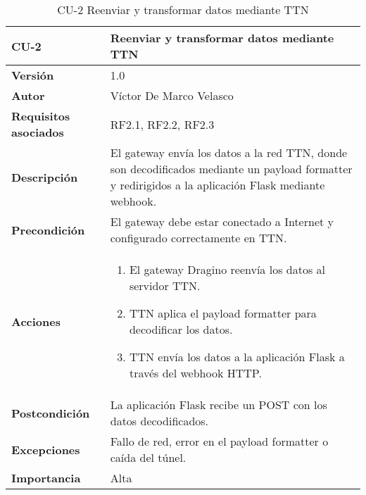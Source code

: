 \begin{table}[p]
	\centering
	\begin{tabularx}{\linewidth}{ p{} p{} }
		\toprule
		\textbf{CU-2}    & Reenviar y transformar datos mediante TTN \\
		\toprule
		\textbf{Versión}              & 1.0 \\
		\textbf{Autor}                & Víctor De Marco Velasco \\
		\textbf{Requisitos asociados} & RF2.1, RF2.2, RF2.3 \\
		\textbf{Descripción}          & El gateway envía los datos a la red TTN, donde son decodificados mediante un payload formatter y redirigidos a la aplicación Flask mediante webhook. \\
		\textbf{Precondición}         & El gateway debe estar conectado a Internet y configurado correctamente en TTN. \\
		\textbf{Acciones}             &
		\begin{enumerate}
			\item El gateway Dragino reenvía los datos al servidor TTN.
			\item TTN aplica el payload formatter para decodificar los datos.
			\item TTN envía los datos a la aplicación Flask a través del webhook HTTP.
		\end{enumerate}\\
		\textbf{Postcondición}        & La aplicación Flask recibe un POST con los datos decodificados. \\
		\textbf{Excepciones}          & Fallo de red, error en el payload formatter o caída del túnel. \\
		\textbf{Importancia}          & Alta \\
		\bottomrule
	\end{tabularx}
	\caption{CU-2 Reenviar y transformar datos mediante TTN}
\end{table}
